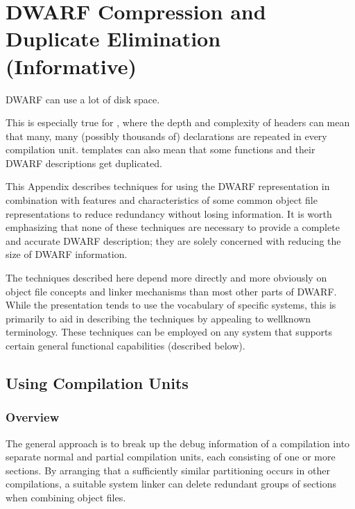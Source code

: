 \chapter[Compression (Informative)]{DWARF Compression and Duplicate Elimination (Informative)}
\label{app:dwarfcompressionandduplicateeliminationinformative}


DWARF 
can 
use a lot of disk space.

This is especially true for , where the depth and complexity
of headers can mean that many, many (possibly thousands of)
declarations are repeated in every compilation unit. 
templates can also mean that some functions and their DWARF
descriptions get duplicated.

This Appendix describes techniques for using the DWARF
representation in combination with features and characteristics
of some common object file representations to reduce redundancy
without losing information. It is worth emphasizing that none
of these techniques are necessary to provide a complete and
accurate DWARF description; they are solely concerned with
reducing the size of DWARF information.

The techniques described here depend more directly and more
obviously on object file concepts and linker mechanisms than
most other parts of DWARF. While the presentation tends to
use the vocabulary of specific systems, this is primarily to
aid in describing the techniques by appealing to well\dash known
terminology. These techniques can be employed on any system
that supports certain general functional capabilities
(described below).


\section{Using Compilation Units}
\label{app:usingcompilationunits}

\subsection{Overview}
The general approach is to break up the debug information of
a compilation into separate normal and partial compilation
units, each consisting of one or more sections. By arranging
that a sufficiently similar partitioning occurs in other
compilations, a suitable system linker can delete redundant
groups of sections when combining object files.

